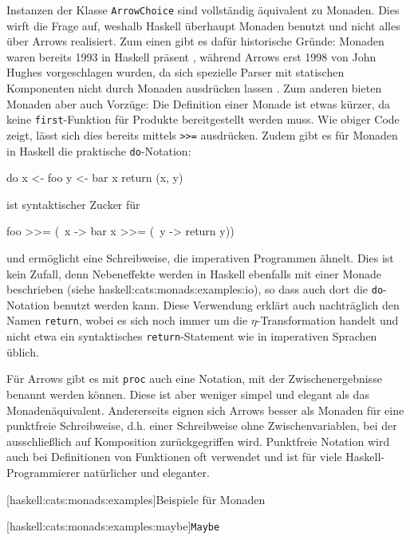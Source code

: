 \documentclass[12pt, a4paper, bibgerm]{scrbook}
\newenvironment{DIFnomarkup}{}{}
\newcommand\icode[1]{\lstinline?#1?}
\newcommand\lsubsubsection{}
\newcommand\lparagraph{}
\newcommand\sref{}
\begin{document}
Instanzen der Klasse \icode{ArrowChoice} sind vollständig äquivalent zu
Monaden.  Dies wirft die Frage auf, weshalb Haskell überhaupt Monaden
benutzt und nicht alles über Arrows realisiert. Zum einen gibt es dafür
historische Gründe: Monaden waren bereits 1993 in Haskell präsent
\cite[S.23ff]{HaskellHistory}, während Arrows erst 1998 von John Hughes
vorgeschlagen wurden, da sich spezielle Parser mit statischen
Komponenten nicht durch Monaden ausdrücken lassen \cite{Hughes}. Zum
anderen bieten Monaden aber auch Vorzüge: Die Definition einer Monade
ist etwas kürzer, da keine \icode{first}-Funktion für Produkte
bereitgestellt werden muss. Wie obiger Code zeigt, lässt sich dies
bereits mittels \icode{>>=} %
ausdrücken. Zudem gibt es für Monaden in Haskell die praktische
\icode{do}-Notation:
\begin{DIFnomarkup}\begin{code}
do x <- foo
   y <- bar x
   return (x, y)
\end{code}\end{DIFnomarkup}
ist syntaktischer Zucker für
\begin{DIFnomarkup}\begin{code}
foo >>= (\ x ->
  bar x >>= (\ y ->
    return y))
\end{code}\end{DIFnomarkup} %
und ermöglicht eine Schreibweise, die imperativen Programmen ähnelt.
Dies ist kein Zufall, denn Nebeneffekte werden in Haskell ebenfalls mit
einer Monade beschrieben (siehe \sref{haskell:cats:monads:examples:io}),
so dass auch dort die \icode{do}-Notation benutzt werden kann. Diese
Verwendung erklärt auch nachträglich den Namen \icode{return}, wobei es
sich noch immer um die $\eta$-Transformation handelt und nicht etwa ein
syntaktisches \icode{return}-Statement wie in imperativen Sprachen
üblich.

Für Arrows gibt es mit \icode{proc} auch eine Notation, mit der
Zwischenergebnisse benannt werden können. Diese ist aber weniger simpel
und elegant als das Monadenäquivalent. Andererseits eignen sich
Arrows besser als Monaden für eine punktfreie Schreibweise, d.h. einer
Schreibweise ohne Zwischenvariablen, bei der ausschließlich auf
Komposition zurückgegriffen wird. Punktfreie Notation wird auch bei
Definitionen von Funktionen oft verwendet und ist für viele
Haskell-Programmierer natürlicher und eleganter.

\lsubsubsection[haskell:cats:monads:examples]{Beispiele für Monaden}

\lparagraph[haskell:cats:monads:examples:maybe]{\icode{Maybe}}
\end{document}
